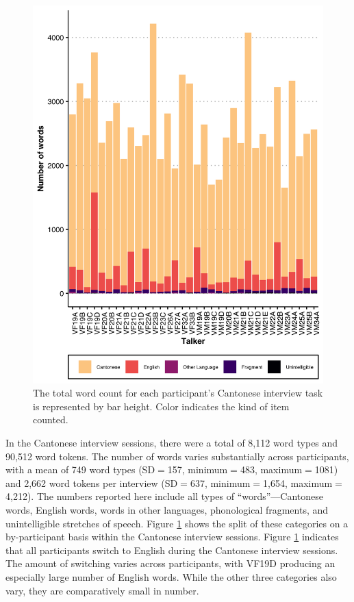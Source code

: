 \begin{figure}[!htbp]
  \begin{center}
  \includegraphics[width=4.9in]{figures/ch2_cantonesetypecounts_5in.png} 
  \caption{The total word count for each participant's Cantonese interview task is represented by bar height. Color indicates the kind of item counted. }
  \label{ch2:fig:cantonesetypecounts}
  \end{center}
\end{figure}

In the Cantonese interview sessions, there were a total of 8,112 word types and 90,512 word tokens. The number of words varies substantially across participants, with a mean of 749 word types (SD$=$157, minimum$=$483, maximum$=$1081) and 2,662 word tokens per interview (SD$=$637, minimum$=$1,654, maximum$=$4,212). The numbers reported here include all types of ``words''---Cantonese words, English words, words in other languages, phonological fragments, and unintelligible stretches of speech. Figure \ref{ch2:fig:cantonesetypecounts} shows the split of these categories on a by-participant basis within the Cantonese interview sessions. Figure \ref{ch2:fig:cantonesetypecounts} indicates that all participants switch to English during the Cantonese interview sessions. The amount of switching varies across participants, with VF19D producing an especially large number of English words. While the other three categories also vary, they are comparatively small in number. 

